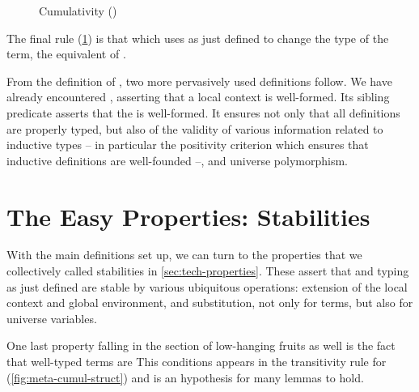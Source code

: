 \begin{figure}
  \ContinuedFloat
  \caption{Cumulativity ()}
  \label{fig:meta-typing-cumul}
\end{figure}

The final rule (\cref{fig:meta-typing-cumul}) is that which uses  as just defined
to change the type of the term, \eg the equivalent of .

From the definition of , two more pervasively used definitions
follow. We have already encountered ,
asserting that a local context is well-formed.
Its sibling predicate %
asserts that the  is well-formed. It ensures not only that all definitions
are properly typed, but also of the validity of various information
related to inductive types – in particular the positivity criterion which ensures that inductive
definitions are well-founded –, and universe polymorphism.

\section[Stabilities]{The Easy Properties: Stabilities}
\label{sec:meta-stabilities}

With the main definitions set up, we can turn to the properties that we collectively called
stabilities in \cref{sec:tech-properties}. These assert that  and typing
as just defined are stable by various ubiquitous operations: extension of the local context%
and global environment,%
and substitution, not only for terms,%
but also for universe variables.%

\AP One last property falling in the section of low-hanging fruits as well
is the fact that well-typed terms are %
This  conditions appears
in the transitivity rule for 
(\cref{fig:meta-cumul-struct}) and is an hypothesis for many lemmas to hold.

